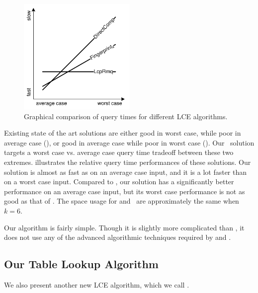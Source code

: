 \documentclass[a4]{article}
\newcommand*{\pref}{\prettyref}
\begin{document}
\begin{figure}[tp]
    \begin{center}
        \includegraphics[width=0.5\textwidth,page=1]{wc-avg.pdf}
    \end{center}
    \caption{\label{fig:wc-avg}Graphical comparison of query times for different LCE algorithms.}
\end{figure}

Existing state of the art solutions are either good in worst case, while poor in average case (), or good in average case while poor in worst case (). Our \fprintk\ solution targets a worst case vs. average case query time tradeoff between these two extremes. \pref{fig:wc-avg} illustrates the relative query time performances of these solutions. Our solution is almost as fast as  on an average case input, and it is a lot faster than  on a worst case input. Compared to , our solution has a significantly better performance on an average case input, but its worst case performance is not as good as that of . The space usage for  and \fprintk\ are approximately the same when $k=6$.

Our algorithm is fairly simple. Though it is slightly more complicated than , it does not use any of the advanced algorithmic techniques required by  and .

\ifreport

\subsection{Our Table Lookup Algorithm}

We also present another new LCE algorithm, which we call .
\end{document}
